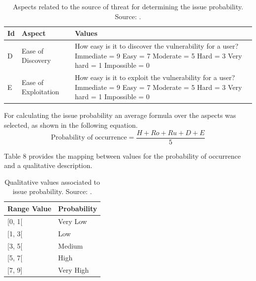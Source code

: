 \documentclass[preprint,10pt]{elsarticle}
\begin{document}
\begin{table}[h!]
    \caption{Aspects related to the source of threat for determining the issue probability. Source: .}
    \label{tab:7}
    \centering
    \begin{tabular}{llp{7cm}}
        \toprule
        \textbf{Id} & \textbf{Aspect} & \textbf{Values} \\
        \midrule
        D & Ease of Discovery & How easy is it to discover the vulnerability for a user? \newline Immediate = 9 \newline Easy = 7 \newline Moderate = 5 \newline Hard = 3 \newline Very hard = 1 \newline Impossible = 0 \\
        \addlinespace
        E & Ease of Exploitation & How easy is it to exploit the vulnerability for a user? \newline Immediate = 9 \newline Easy = 7 \newline Moderate = 5 \newline Hard = 3 \newline Very hard = 1 \newline Impossible = 0 \\
        \bottomrule
    \end{tabular}
\end{table}

For calculating the issue probability an average formula over the aspects was selected, as shown in the following equation.
\begin{equation}
    \text{Probability of occurrence} = \frac{H+Ro+Ru+D+E}{5}
\end{equation}

Table 8 provides the mapping between values for the probability of occurrence and a qualitative description.

\begin{table}[h!]
    \caption{Qualitative values associated to issue probability. Source: .}
    \label{tab:8}
    \centering
    \begin{tabular}{ll}
        \toprule
        \textbf{Range Value} & \textbf{Probability} \\
        \midrule
        {[}0, 1{[} & Very Low \\
        {[}1, 3{[} & Low \\
        {[}3, 5{[} & Medium \\
        {[}5, 7{[} & High \\
        {[}7, 9{]} & Very High \\
        \bottomrule
    \end{tabular}
\end{table}
\end{document}
